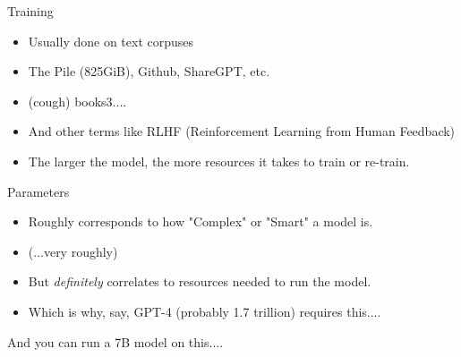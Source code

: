 \documentclass[handout]{beamer} %
\begin{document}
\begin{frame}{Training}
	\begin{itemize}
		\item Usually done on text corpuses
		\pause
		\item The Pile (825GiB), Github, ShareGPT, etc.
		\pause
		\item (cough) books3....
		\pause
		\item And other terms like RLHF (Reinforcement Learning from Human Feedback)
		\pause
		\item The larger the model, the more resources it takes to train or re-train.
	\end{itemize}
\end{frame}

\begin{frame}{Parameters}
	\begin{itemize}
		\item Roughly corresponds to how "Complex" or "Smart" a model is.
		\pause
		\item (...very roughly)
		\pause 
		\item But \textit{definitely} correlates to resources needed to run the model.
		\pause
		\item Which is why, say, GPT-4 (probably 1.7 trillion) requires this....
	\end{itemize}
\end{frame}

\begin{frame}[plain]
\end{frame}

\begin{frame}
	And you can run a 7B model on this....
\end{frame}
\end{document}
